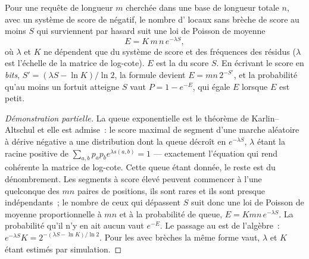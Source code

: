\begin{theorem}\label{thm:b3:bioinformatics:evalue}
Pour une requête de longueur $m$ cherchée dans une base de longueur
totale $n$, avec un système de score de  négatif, le nombre
d' locaux sans brèche de score au moins $S$ qui surviennent
par hasard suit une loi de Poisson de moyenne
\[
E = K\,m\,n\,e^{-\lambda S},
\]
où $\lambda$ et $K$ ne dépendent que du système de score et des
fréquences des résidus ($\lambda$ est l'échelle de la matrice de
log-cote). $E$ est la \emph{} du score $S$. En écrivant le
score en \emph{bits}, $S' = (\lambda S - \ln K)/\ln 2$, la formule
devient $E = m n\, 2^{-S'}$, et la probabilité qu'au moins un
 fortuit atteigne $S$ vaut $P = 1 - e^{-E}$, qui égale $E$
lorsque $E$ est petit.
\end{theorem}
\begin{proof}[Démonstration partielle]
La queue exponentielle est le théorème de Karlin--Altschul et elle est
admise~: le score maximal de segment d'une marche aléatoire à dérive
négative a une distribution dont la queue décroît en $e^{-\lambda S}$,
$\lambda$ étant la racine positive de
$\sum_{a,b} p_{a} p_{b} e^{\lambda s(a,b)} = 1$ --- exactement
l'équation qui rend cohérente la matrice de log-cote. Cette queue
étant donnée, le reste est du dénombrement. Les segments à score élevé
peuvent commencer à l'une quelconque des $mn$ paires de positions, ils
sont rares et ils sont presque indépendants~; le nombre de ceux qui
dépassent $S$ suit donc une loi de Poisson de moyenne proportionnelle à
$mn$ et à la probabilité de queue, $E = Kmn\,e^{-\lambda S}$. La
probabilité qu'il n'y en ait aucun vaut $e^{-E}$. Le passage au  est de l'algèbre~: $e^{-\lambda S} K = 2^{-(\lambda S -
\ln K)/\ln 2}$. Pour les  avec brèches la même forme vaut,
$\lambda$ et $K$ étant estimés par simulation.
\end{proof}


